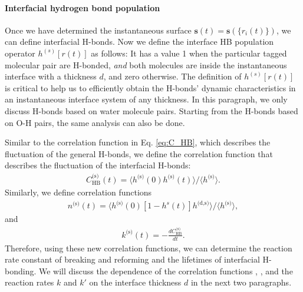 \FloatBarrier
\paragraph{Interfacial hydrogen bond population} \label{IHBP}
Once we have determined the instantaneous surface ${\mathbf s}(t)={\mathbf s}(\{{r}_i(t)\})$, we can define interfacial H-bonds.
Now we define the interface HB population operator $h^{(s)}[{r}(t)]$ as follows:
It has a value 1 when the particular tagged molecular pair are H-bonded, \emph{and} both molecules are inside the instantaneous interface 
with a thickness $d$, and zero otherwise. 
The definition of  $h^{(s)}[{r}(t)]$ is critical to help us to efficiently obtain the H-bonds' dynamic characteristics in an
instantaneous interface system of any thickness. %
In this paragraph, we only discuss H-bonds based on water molecule pairs. Starting from the H-bonds based on O-H pairs, the same analysis 
can also be done. 

Similar to the correlation function \CHB in Eq. \ref{eq:C_HB}, which describes the fluctuation of the general H-bonds,
we define the correlation function \CSHB that describes the fluctuation of the interfacial H-bonds: 
\begin{eqnarray}
C^\text{(s)}_{\text{HB}}(t)=\langle h^\text{(s)}(0)h^\text{(s)}(t) \rangle/\langle h^\text{(s)}\rangle
\label{eq:C_s_HB}.
\end{eqnarray}
%
Similarly, we define correlation functions 
\begin{eqnarray}
n^\text{(s)}(t)=\langle h^\text{(s)}(0)[1-h^s(t)]h^{\text{(d,s)}} \rangle/\langle h^\text{(s)}\rangle
\label{eq:n_s_HB},
\end{eqnarray}
and 
\begin{eqnarray}
k^\text{(s)}(t)= -\frac{dC^\text{(s)}_\text{HB}}{dt}
\label{eq:k_s_HB}.
\end{eqnarray}
Therefore, using these new correlation functions, we can determine the reaction rate constant of breaking and reforming and the lifetimes of interfacial H-bonding.
We will discuss the dependence of the correlation functions \CHB, \CSHB, and the reaction rates $k$ and $k'$ on the interface thickness $d$ in the next two paragraphs.
%
\FloatBarrier
